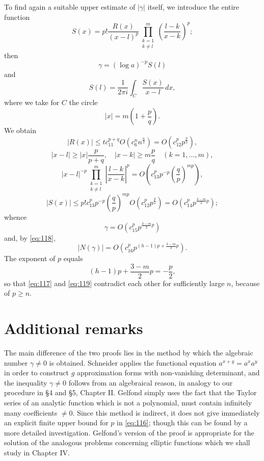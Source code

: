 To find again a suitable upper estimate of $|\gamma|$ itself, we introduce the entire function
\[
S(x) = p! \frac{R(x)}{(x-l)^p} \prod_{\substack{k=1\\k\neq l}}^m \left(\frac{l-k}{x-k}\right)^p;
\]
then
\[
\gamma = (\log a)^{-p} S(l)
\]
and
\[
S(l) = \frac{1}{2\pi i} \int_{C} \frac{S(x)}{x-l} \, dx,
\]
where we take for $C$ the circle
\[
|x| = m\left(1 + \frac{p}{q}\right).
\]
We obtain
\[
|R(x)| \le t c_{11}^{p+q} O(c_6^n n^{\frac{n}{2}}) = O(c_{12}^p p^{\frac{p}{2}}),
\]
\[
|x-l| \ge |x| \frac{p}{p+q}, \quad |x-k| \ge m \frac{p}{q} \quad (k=1,\dots,m),
\]
\[
|x-l|^{-p} \prod_{\substack{k=1 \\ k\neq l}}^{m} \left|\frac{l-k}{x-k}\right|^{p} = O\left(c_{13}^p p^{-p} \left(\frac{q}{p}\right)^{mp}\right),
\]
\[
|S(x)| \le p! c_{13}^p p^{-p} \left(\frac{q}{p}\right)^{mp} O\left(c_{12}^p p^{\frac{p}{2}}\right) = O\left(c_{14}^p p^{\frac{3-m}{2}p}\right);
\]
whence
\[
\gamma = O\left(c_{15}^p p^{\frac{3-m}{2}p}\right)
\]
and, by \eqref{eq:118},
\begin{equation}
|N(\gamma)| = O\left(c_{16}^p p^{(h-1)p + \frac{3-m}{2}p}\right). \tag{119}\label{eq:119}
\end{equation}
The exponent of $p$ equals
\[
(h-1)p + \frac{3-m}{2}p = -\frac{p}{2},
\]
so that \eqref{eq:117} and \eqref{eq:119} contradict each other for sufficiently large $n$, because of $p \ge n$.

\section{Additional remarks}\label{sec:3}

The main difference of the two proofs lies in the method by which the algebraic number $\gamma \neq 0$ is obtained. Schneider applies the functional equation $a^{x+y} = a^x a^y$ in order to construct $g$ approximation forms with non-vanishing determinant, and the inequality $\gamma \neq 0$ follows from an algebraical reason, in analogy to our procedure in \S 4 and \S 5, Chapter II. Gelfond simply uses the fact that the Taylor series of an analytic function which is not a polynomial, must contain infinitely many coefficients $\neq 0$. Since this method is indirect, it does not give immediately an explicit finite upper bound for $p$ in \eqref{eq:116}; though this can be found by a more detailed investigation. Gelfond's version of the proof is appropriate for the solution of the analogous problems concerning elliptic functions which we shall study in Chapter IV.

